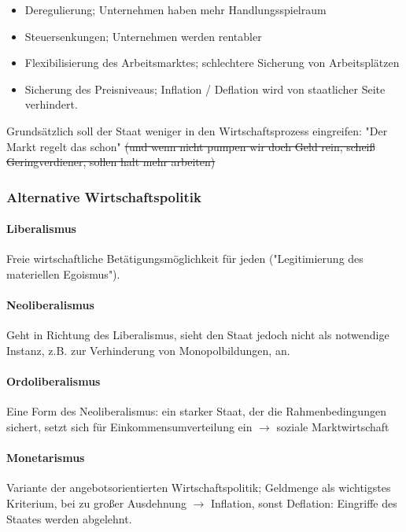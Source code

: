 \documentclass{article}
\begin{document}
	\begin{itemize}
		\item Deregulierung; Unternehmen haben mehr Handlungsspielraum
		\item Steuersenkungen; Unternehmen werden rentabler
		\item Flexibilisierung des Arbeitsmarktes; schlechtere Sicherung von Arbeitsplätzen
		\item Sicherung des Preisniveaus; Inflation / Deflation wird von staatlicher Seite verhindert.
	\end{itemize}

	Grundsätzlich soll der Staat weniger in den Wirtschaftsprozess eingreifen: "Der Markt regelt das schon" \sout{(und wenn nicht pumpen wir doch Geld rein, scheiß Geringverdiener, sollen halt mehr arbeiten)}

	\subsubsection{Alternative Wirtschaftspolitik}

	\paragraph{Liberalismus}
	Freie wirtschaftliche Betätigungsmöglichkeit für jeden ("Legitimierung des materiellen Egoismus").

	\paragraph{Neoliberalismus}
	Geht in Richtung des Liberalismus, sieht den Staat jedoch nicht als notwendige Instanz, z.B. zur Verhinderung von Monopolbildungen, an.

	\paragraph{Ordoliberalismus}
	Eine Form des Neoliberalismus: ein starker Staat, der die Rahmenbedingungen sichert, setzt sich für Einkommensumverteilung ein $\rightarrow$ soziale Marktwirtschaft 

	\paragraph{Monetarismus}
	Variante der angebotsorientierten Wirtschaftspolitik; Geldmenge als wichtigstes Kriterium, bei zu großer Ausdehnung $\rightarrow$ Inflation, sonst Deflation: Eingriffe des Staates werden abgelehnt.
\end{document}

